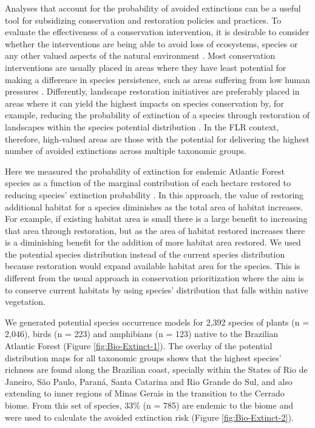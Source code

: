 Analyses that account for the probability of avoided extinctions can be a useful tool for subsidizing conservation and restoration policies and practices. To evaluate the effectiveness of a conservation intervention, it is desirable to consider whether the interventions are being able to avoid loss of ecosystems, species or any other valued aspects of the natural environment \citep{Pressey2015}. Most conservation interventions are usually placed in areas where they have least potential for making a difference in species persistence, such as areas suffering from low human pressures \citep{Andam2008}. Differently, landscape restoration initiatives are preferably placed in areas where it can yield the highest impacts on species conservation by, for example, reducing the probability of extinction of a species through restoration of landscapes within the species potential distribution \citep{Thomas2004, Strassburg0StrategicCosts}. In the FLR context, therefore, high-valued areas are those with the potential for delivering the highest number of avoided extinctions across multiple taxonomic groups. 
	
Here we measured the probability of extinction for endemic Atlantic Forest species as a function of the marginal contribution of each hectare restored to reducing species’ extinction probability \cite{Strassburg0StrategicCosts}. In this approach, the value of restoring additional habitat for a species diminishes as the total area of habitat increases. For example, if existing habitat area is small there is a large benefit to increasing that area through restoration, but as the area of habitat restored increases there is a diminishing benefit for the addition of more habitat area restored. We used the potential species distribution instead of the current species distribution because restoration would expand available habitat area for the species. This is different from the usual approach in conservation prioritization where the aim is to conserve current habitats by using species’ distribution that falls within native vegetation.

We generated potential species occurrence models for 2,392 species of plants (n = 2,046), birds (n = 223) and amphibians (n = 123) native to the Brazilian Atlantic Forest (Figure \ref{fig:Bio-Extinct-1}). The overlay of the potential distribution maps for all taxonomic groups shows that the highest species’ richness are found along the Brazilian coast, specially within the States of Rio de Janeiro, São Paulo, Paraná, Santa Catarina and Rio Grande do Sul, and also extending to inner regions of Minas Gerais in the transition to the Cerrado biome. From this set of species, 33\% (n = 785) are endemic to the biome and were used to calculate the avoided extinction risk (Figure \ref{fig:Bio-Extinct-2}).  \\
 
